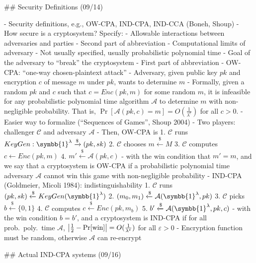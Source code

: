 \documentclass[notes]{agony}
\newcommand{\xgets}{\xleftarrow}
\newcommand{\ndgets}{\xgets{\mathdollar}}
\newcommand{\ndto}{\xto{\mathdollar}}
\newcommand{\one}{\symbb{1}}
\begin{document}
\begin{markdown}
## Security Definitions (09/14)

- Security definitions, e.g., OW-CPA, IND-CPA, IND-CCA (Boneh, Shoup)
- How secure is a cryptosystem? Specify:
    - Allowable interactions between adversaries and parties
        - Second part of abbreviation
    - Computational limits of adversary
        - Not usually specified, usually probabilistic polynomial time
    - Goal of the adversary to ``break'' the cryptosystem
        - First part of abbreviation
- OW-CPA: ``one-way chosen-plaintext attack''
    - Adversary, given public key $pk$ and encryption $c$ of message $m$ under $pk$, wants to determine $m$
    - Formally, given a random $pk$ and $c$ such that $c = Enc(pk, m)$ for some random $m$, it is infeasible for any probabilistic polynomial time algorithm $\mathcal A$ to determine $m$ with non-negligible probability. That is, $\Pr[\mathcal A(pk,c) = m] = O(\frac{1}{\lambda^c})$ for all $c > 0$.
- Easier way to formalize (``Sequences of Games'', Shoup 2004)
    - Two players: challenger $\mathcal C$ and adversary $\mathcal A$
    - Then, OW-CPA is
        1. $\mathcal C$ runs $KeyGen : \one^\lambda \ndto (pk, sk)$
        2. $\mathcal C$ chooses $m \ndgets M$
        3. $\mathcal C$ computes $c \gets Enc(pk, m)$
        4. $m' \ndgets \mathcal A(pk, c)$
        - with the win condition that $m' = m$, and we say that a cryptosystem is OW-CPA if a probabilistic polynomial time adversary $\mathcal A$ cannot win this game with non-negligible probability
    - IND-CPA (Goldmeier, Micoli 1984): indistinguishability
        1. $\mathcal C$ runs $(pk, sk) \ndgets KeyGen(\one^\lambda)$
        2. $(m_0,m_1) \ndgets \mathcal A(\one^\lambda, pk)$
        3. $\mathcal C$ picks $b \ndgets \{0,1\}$
        4. $\mathcal C$ computes $c \ndgets Enc(pk, m_b)$
        5. $b' \ndgets \mathcal A(\one^\lambda, pk, c)$
        - with the win condition $b = b'$, and a cryptosystem is IND-CPA if for all prob.\ poly.\ time $\mathcal A$, $\abs{\frac12 - \Pr[\text{win}]} = O(\frac{1}{\lambda^\varepsilon})$ for all $\varepsilon > 0$
        - Encryption function must be random, otherwise $\mathcal A$ can re-encrypt

## Actual IND-CPA systems (09/16)


\end{markdown}
\end{document}
